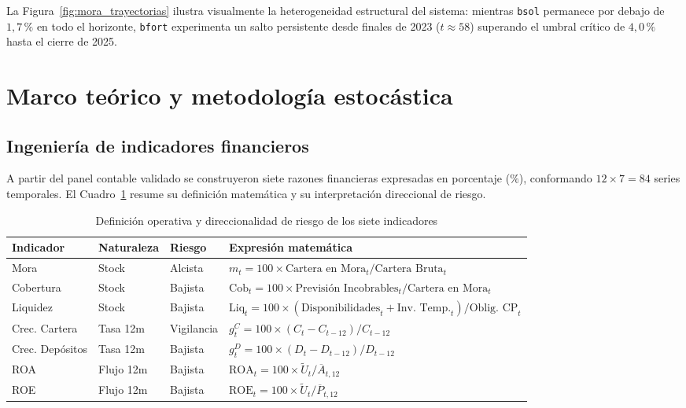 \documentclass[11pt,letterpaper]{article}
\begin{document}
La Figura~\ref{fig:mora_trayectorias} ilustra visualmente la heterogeneidad estructural del sistema: mientras \texttt{bsol} permanece por debajo de \(1{,}7\,\%\) en todo el horizonte, \texttt{bfort} experimenta un salto persistente desde finales de 2023 (\(t \approx 58\)) superando el umbral crítico de \(4{,}0\,\%\) hasta el cierre de 2025.

\section{Marco teórico y metodología estocástica}

\subsection{Ingeniería de indicadores financieros}

A partir del panel contable validado se construyeron siete razones financieras expresadas en porcentaje (\(\%\)), conformando \(12 \times 7 = 84\) series temporales. El Cuadro~\ref{tab:indicadores} resume su definición matemática y su interpretación direccional de riesgo.

\begin{table}[H]
\centering
\caption{Definición operativa y direccionalidad de riesgo de los siete indicadores}
\label{tab:indicadores}
\small
\begin{tabular}{lllp{6.0cm}}
\toprule
Indicador & Naturaleza & Riesgo & Expresión matemática \\
\midrule
Mora & Stock & Alcista & \(m_t = 100 \times \text{Cartera en Mora}_t / \text{Cartera Bruta}_t\) \\
Cobertura & Stock & Bajista & \(\text{Cob}_t = 100 \times \text{Previsión Incobrables}_t / \text{Cartera en Mora}_t\) \\
Liquidez & Stock & Bajista & \(\text{Liq}_t = 100 \times (\text{Disponibilidades}_t + \text{Inv. Temp.}_t) / \text{Oblig. CP}_t\) \\
Crec. Cartera & Tasa 12m & Vigilancia & \(g^C_t = 100 \times (C_t - C_{t-12}) / C_{t-12}\) \\
Crec. Depósitos & Tasa 12m & Bajista & \(g^D_t = 100 \times (D_t - D_{t-12}) / D_{t-12}\) \\
ROA & Flujo 12m & Bajista & \(\text{ROA}_t = 100 \times \widetilde{U}_t / \overline{A}_{t,12}\) \\
ROE & Flujo 12m & Bajista & \(\text{ROE}_t = 100 \times \widetilde{U}_t / \overline{P}_{t,12}\) \\
\bottomrule
\end{tabular}
\end{table}
\end{document}
